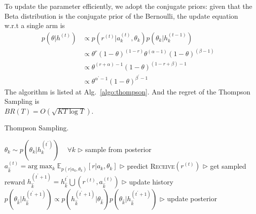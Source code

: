 \documentclass[11pt]{article}
\begin{document}
\vspace{-.5mm}
To update the parameter efficiently, we adopt the conjugate priors: given that the Beta distribution is the conjugate prior of the Bernoulli, the update equation w.r.t a single arm is
\begin{align*}
    p(\theta | h^{(t)}) &\propto p(r^{(t)} | a_k^{(t)}, \theta_k) p(\theta_k | h_k^{(t-1)})\, \\
    &\propto \theta^r (1-\theta)^{(1-r)} \theta^{(\alpha -1)} (1-\theta)^{(\beta - 1)}\, \\
    &\propto \theta^{(r+\alpha)-1} (1-\theta)^{(1-r+\beta)-1}\, \\
    &\propto \theta^{\alpha^{\prime}-1} (1-\theta)^{\beta^{\prime}-1}
\end{align*}
\vspace{-.5mm}
The algorithm is listed at Alg.~\ref{algo:thompson}.
And the regret of the Thompson Sampling is \\ $BR(T) = O (\sqrt{KT \log T})$.
\begin{algorithm}[H]
\small
\caption{Thompson Sampling.}
\label{algo:thompson}
\begin{algorithmic}[1]
\State $\theta_k \sim p(\theta_k | h_k^{(t^{\prime})})$ \,\,\, $\forall k$ \hfill $\triangleright$ sample from posterior
\State $a_{\hat{k}}^{(t)} = \mathrm{arg} \max_k \mathbb{E}_{p(r | a_k, \theta_k)} [r | a_k, \theta_k] $ \hfill $\triangleright$ predict
\State \textsc{Receive}$ (r^{(t)})$ \hfill $\triangleright$ get sampled reward
\State $h_{\hat{k}}^{(t^{\prime} + 1)} = h_{\hat{k}}^{t^{\prime}} \bigcup (r^{(t)}, a_{\hat{k}}^{(t)} )$ \hfill $\triangleright$ update history
\State $p(\theta_{\hat{k}} | h_{\hat{k}}^{(t^{\prime} + 1)} ) \propto p(h_{\hat{k}}^{(t^{\prime} +1)} | \theta_{\hat{k}} )  p( \theta_{\hat{k}} | h_{\hat{k}}^{(t^{\prime} +1)}) $ \hfill $\triangleright$ update posterior
\EndFor
\EndFunction

\end{algorithmic}
\end{algorithm}


\clearpage


\end{document}
